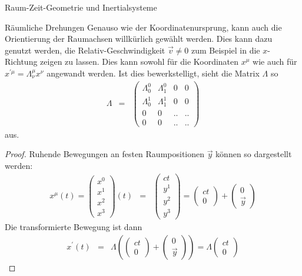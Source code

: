 \begin{chapter}{\titlestr}
\begin{section}{Raum-Zeit-Geometrie und Inertialsysteme}
\begin{subsection}{Räumliche Drehungen}
Genauso wie der Koordinatenursprung, kann auch die Orientierung der Raumachsen willkürlich gewählt werden. Dies kann dazu genutzt werden,
die Relativ-Geschwindigkeit $\vec{v}\ne 0$ zum Beispiel in die $x$-Richtung zeigen zu lassen. Dies kann sowohl für die Koordinaten $x^\mu$ wie
auch für $x^{\prime\mu}=\Lambda^\mu_\nu x^\nu$ angewandt werden. Ist dies bewerkstelligt, sieht die Matrix $\Lambda$ so
\begin{eqnarray*}
\Lambda &=& \begin{pmatrix}
\Lambda^0_0 & \Lambda^0_1 & 0 & 0\\
\Lambda^1_0 & \Lambda^1_1 & 0& 0\\
0 &0 &..&..\\
0 &0 &.. & ..
\end{pmatrix}
\end{eqnarray*}
aus.
\begin{proof}
Ruhende Bewegungen an festen Raumpositionen $\vec{y}$ können so dargestellt werden:
\begin{eqnarray*}
x^\mu(t) =
\begin{pmatrix}
x^0\\x^1\\x^2\\x^3
\end{pmatrix}(t)
&=&
\begin{pmatrix}
ct\\y^1\\y^2\\y^3
\end{pmatrix}
=
\begin{pmatrix}
ct\\0
\end{pmatrix}
+
\begin{pmatrix}
0\\ \vec{y}
\end{pmatrix}
\end{eqnarray*}
Die transformierte Bewegung ist dann
\begin{eqnarray*}
x^{\prime}(t) &=& \Lambda\left(\begin{pmatrix}
ct\\0
\end{pmatrix}
+
\begin{pmatrix}
0\\ \vec{y}
\end{pmatrix}
\right)
= \Lambda\begin{pmatrix}
ct\\0
\end{pmatrix}

\end{eqnarray*}
\end{proof}
\end{subsection}
\end{section}
\end{chapter}
